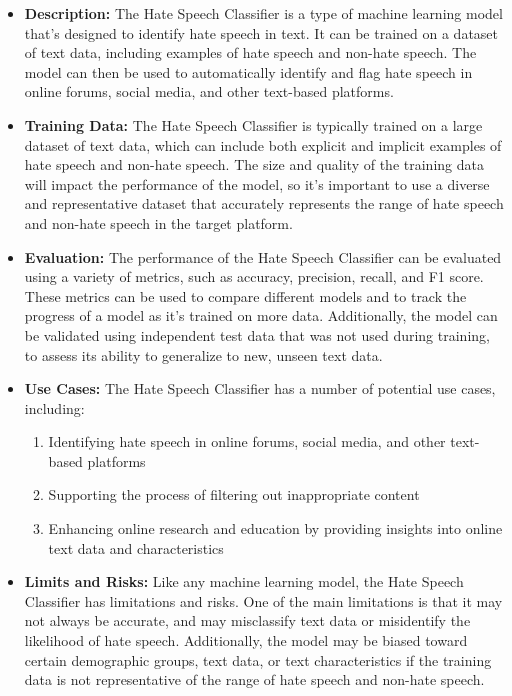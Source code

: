 \begin{itemize}
    \item \textbf{Description:} The Hate Speech Classifier is a type of machine learning model that's designed to identify hate speech in text. It can be trained on a dataset of text data, including examples of hate speech and non-hate speech. The model can then be used to automatically identify and flag hate speech in online forums, social media, and other text-based platforms.
    \item \textbf{Training Data:} The Hate Speech Classifier is typically trained on a large dataset of text data, which can include both explicit and implicit examples of hate speech and non-hate speech. The size and quality of the training data will impact the performance of the model, so it's important to use a diverse and representative dataset that accurately represents the range of hate speech and non-hate speech in the target platform.
    \item \textbf{Evaluation:} The performance of the Hate Speech Classifier can be evaluated using a variety of metrics, such as accuracy, precision, recall, and F1 score. These metrics can be used to compare different models and to track the progress of a model as it's trained on more data. Additionally, the model can be validated using independent test data that was not used during training, to assess its ability to generalize to new, unseen text data.
    \item \textbf{Use Cases:} The Hate Speech Classifier has a number of potential use cases, including:
        \begin{enumerate}  
            \item Identifying hate speech in online forums, social media, and other text-based platforms
            \item Supporting the process of filtering out inappropriate content
            \item Enhancing online research and education by providing insights into online text data and characteristics
        \end{enumerate}
    \item \textbf{Limits and Risks:} Like any machine learning model, the Hate Speech Classifier has limitations and risks. One of the main limitations is that it may not always be accurate, and may misclassify text data or misidentify the likelihood of hate speech. Additionally, the model may be biased toward certain demographic groups, text data, or text characteristics if the training data is not representative of the range of hate speech and non-hate speech.

\end{itemize}
